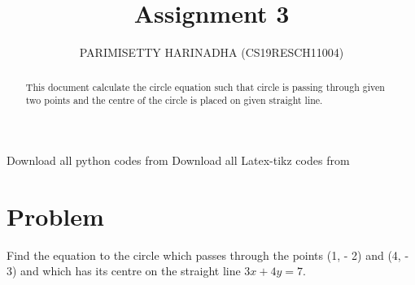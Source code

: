 \documentclass[journal,12pt,twocolumn]{IEEEtran}
\title{Assignment 3}
\author{PARIMISETTY HARINADHA (CS19RESCH11004)}
\begin{document}
\maketitle
\newpage
\begin{abstract}
This document calculate the circle equation such that circle is passing through given two points and the centre of the circle is placed on given straight line.
\end{abstract}
Download all python codes from 
Download all Latex-tikz codes from 
\section{Problem}
Find the equation to the circle which passes through the points (1, - 2) and (4, - 3) and which has its centre on the straight line $3x + 4y = 7$.
\end{document}
